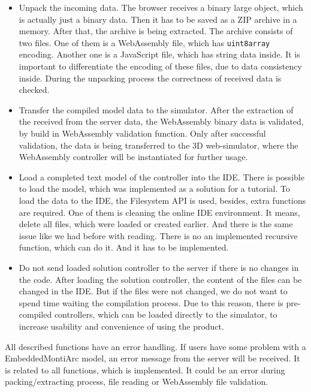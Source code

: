 \begin{itemize}
    \item Unpack the incoming data. The browser receives a binary large object, which is actually just a binary data. Then it has to be saved as a ZIP archive in a memory. After that, the archive is being extracted. The archive consists of two files. One of them is a WebAssembly file, which has \texttt{uint8array} encoding. Another one is a JavaScript file, which has string data inside. It is important to differentiate the encoding of these files, due to data consistency inside. During the unpacking process the correctness of received data is checked.
    \item Transfer the compiled model data to the simulator. After the extraction of the received from the server data, the WebAssembly binary data is validated, by build in WebAssembly validation function. Only after successful validation, the data is being transferred to the 3D web-simulator, where the WebAssembly controller will be instantiated for further usage.
    \item Load a completed text model of the controller into the IDE. There is possible to load the model, which was implemented as a solution for a tutorial. To load the data to the IDE, the Filesystem API is used, besides, extra functions are required. One of them is cleaning the online IDE environment. It means, delete all files, which were loaded or created earlier. And there is the same issue like we had before with reading. There is no an implemented recursive function, which can do it. And it has to be implemented.
    \item Do not send loaded solution controller to the server if there is no changes in the code. After loading the solution controller, the content of the files can be changed in the IDE. But if the files were not changed, we do not want to spend time waiting the compilation process. Due to this reason, there is pre-compiled controllers, which can be loaded directly to the simulator, to increase usability and convenience of using the product.
\end{itemize}
All described functions have an error handling. If users have some problem with a EmbeddedMontiArc model, an error message from the server will be received. It is related to all functions, which is implemented. It could be an error during packing/extracting process, file reading or WebAssembly file validation.

